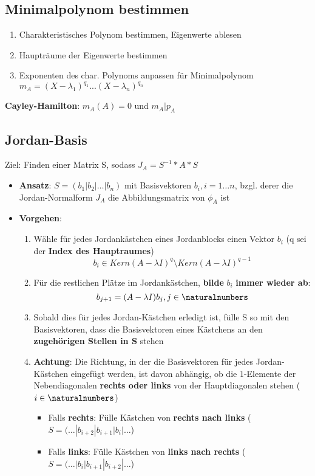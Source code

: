 \subsection{Minimalpolynom bestimmen}%
\label{jd:sub:minimalpolynom_bestimmen}

\begin{enumerate}
	\item Charakteristisches Polynom bestimmen, Eigenwerte ablesen
	\item Haupträume der Eigenwerte bestimmen
	\item Exponenten des char. Polynoms anpassen für Minimalpolynom $m_A = (X - \lambda_1)^{q_1} ... (X - \lambda_n)^{q_n}$
\end{enumerate}
\textbf{Cayley-Hamilton}: $m_A(A) = 0$ und $m_A|p_A$

\newpage
\subsection{Jordan-Basis}%
\label{jd:sub:jordan_basis}

Ziel: Finden einer Matrix S, sodass $J_A = S^{-1} * A * S$
\begin{itemize}
	\item \textbf{Ansatz}: $S = (b_1 | b_2 | \dots | b_n)$ mit Basisvektoren $b_i, i = 1 \dots n$, bzgl. derer die Jordan-Normalform $J_A$ die Abbildungsmatrix von $\phi_A$ ist
	\item \textbf{Vorgehen}:
	\begin{enumerate}
		\item Wähle für jedes Jordankästchen eines Jordanblocks einen Vektor $b_i$ (q sei der \textbf{Index des Hauptraumes}) $$b_i \in Kern(A - \lambda I)^q \setminus Kern(A - \lambda I)^{q-1}$$
		\item Für die restlichen Plätze im Jordankästchen, \textbf{bilde} $b_i$ \textbf{immer wieder ab}: $$b_{j+1} = (A - \lambda I)b_j, j \in \naturalnumbers$$
		\item Sobald dies für jedes Jordan-Kästchen erledigt ist, fülle S so mit den Basisvektoren, dass die Basisvektoren eines Kästchens an den \textbf{zugehörigen Stellen in S} stehen
		\item \textbf{Achtung}: Die Richtung, in der die Basisvektoren für jedes Jordan-Kästchen eingefügt werden, ist davon abhängig, ob die $1$-Elemente der Nebendiagonalen \textbf{rechts oder links} von der Hauptdiagonalen stehen ($i \in \naturalnumbers$)
		\begin{itemize}
			\item Falls \textbf{rechts}: Fülle Kästchen von \textbf{rechts nach links} ($S = (\dots | b_{i+2} | b_{i+1} | b_{i} | \dots$)
			\item Falls \textbf{links}: Fülle Kästchen von \textbf{links nach rechts} ($S = (\dots | b_{i} | b_{i+1} | b_{i+2} | \dots$)
		\end{itemize}
	\end{enumerate}
\end{itemize}


